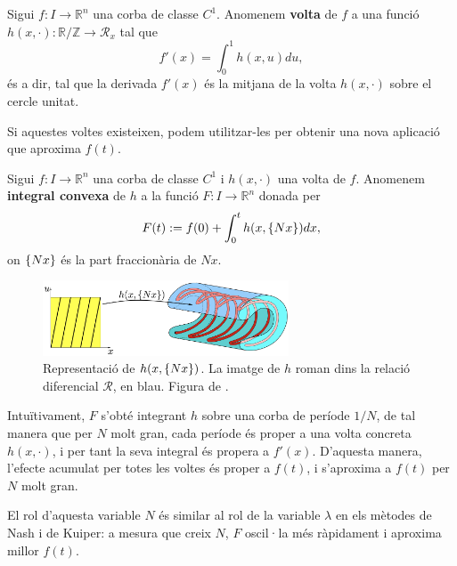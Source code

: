 \begin{defi}
    Sigui $f:I\to\mathbb R^n$ una corba de classe $C^1$. Anomenem \textbf{volta} de $f$ a una funció $h(x, \cdot): \mathbb R / \mathbb Z \to \mathcal R_x$ tal que
    \begin{equation}\label{eq:def voltes}
        f'(x) = \int_0^1 h(x, u)  du,
    \end{equation}
    és a dir, tal que la derivada $f'(x)$ és la mitjana de la volta $h(x, \cdot)$ sobre el cercle unitat.
\end{defi}

Si aquestes voltes existeixen, podem utilitzar-les per obtenir una nova aplicació que aproxima $f(t)$.
\begin{defi}
    Sigui $f:I\to\mathbb R^n$ una corba de classe $C^1$ i $h(x, \cdot)$ una volta de $f$. Anomenem \textbf{integral convexa} de $h$ a la funció $F:I\to\mathbb R^n$ donada per
    \begin{equation*}
        F(t) := f(0) + \int_0^t h(x, \{Nx\})  dx,
    \end{equation*}
    on $\{Nx\}$ és la part fraccionària de $Nx$.
\end{defi}    

\begin{figure}[htbp]
    \centering
    \includegraphics[width=0.65\textwidth]{voltes.png}
    \caption{Representació de $h(x,\{Nx\})$. La imatge de $h$ roman dins la relació diferencial $\mathcal R$, en blau. Figura de \cite{borrelli2013}.}
    \label{fig:cinquena_foto}
\end{figure}

Intuïtivament, $F$ s'obté integrant $h$ sobre una corba de període $1/N$, de tal manera que per $N$ molt gran, cada període és proper a una volta concreta $h(x, \cdot)$, i per tant la seva integral és propera a $f'(x)$. D'aquesta manera, l'efecte acumulat per totes les voltes és proper a $f(t)$, i s'aproxima a $f(t)$ per $N$ molt gran. 
\begin{obs}
    El rol d'aquesta variable $N$ és similar al rol de la variable $\lambda$ en els mètodes de Nash i de Kuiper: a mesura que creix $N$, $F$ oscil·la més ràpidament i aproxima millor $f(t)$.
\end{obs}

